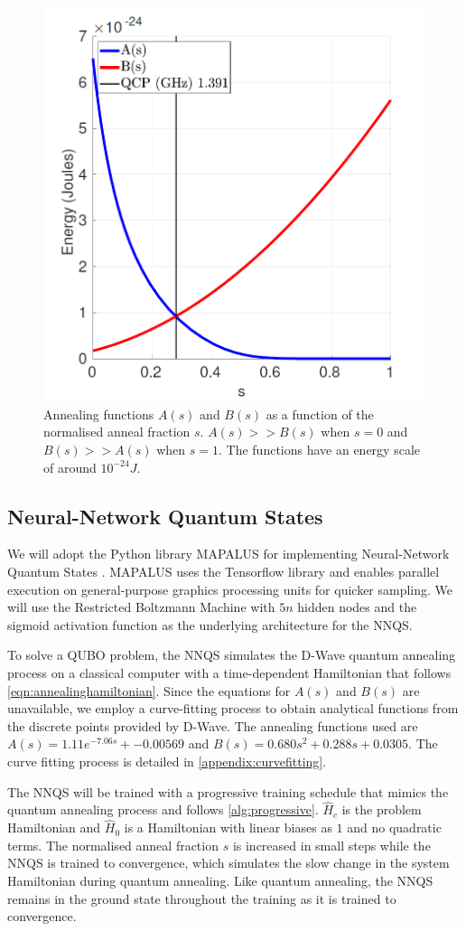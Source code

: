 \begin{figure}[htb!]
    \centering
    \includegraphics[width=0.5\linewidth]{images/dwave_annealing.png}
    \caption[Annealing functions $A(s)$ and $B(s)$ as a function of the normalised anneal fraction $s$. $A(s) >> B(s)$ when $s=0$ and $B(s) >> A(s)$ when $s=1$. The functions have an energy scale of around $10^{-24} J$.]{Annealing functions $A(s)$ and $B(s)$ as a function of the normalised anneal fraction $s$. $A(s) >> B(s)$ when $s=0$ and $B(s) >> A(s)$ when $s=1$. The functions have an energy scale of around $10^{-24} J$. ~\protect\cite{dwaveadvantage}}
    \label{dwaveannealing}
\end{figure}

\subsection{Neural-Network Quantum States}
We will adopt the Python library MAPALUS for implementing Neural-Network Quantum States \cite{b25}. MAPALUS uses the Tensorflow library and enables parallel execution on general-purpose graphics processing units for quicker sampling. We will use the Restricted Boltzmann Machine with $5n$ hidden nodes and the sigmoid activation function as the underlying architecture for the NNQS.

To solve a QUBO problem, the NNQS simulates the D-Wave quantum annealing process on a classical computer with a time-dependent Hamiltonian that follows \autoref{eqn:annealinghamiltonian}. Since the equations for $A(s)$ and $B(s)$ are unavailable, we employ a curve-fitting process to obtain analytical functions from the discrete points provided by D-Wave. The annealing functions used are $A(s) = 1.11e^{-7.06s} + -0.00569$ and $B(s)= 0.680s^2 + 0.288s + 0.0305$. The curve fitting process is detailed in \autoref{appendix:curvefitting}.

The NNQS will be trained with a progressive training schedule that mimics the quantum annealing process and follows \autoref{alg:progressive}. $\hat{H}_c$ is the problem Hamiltonian and $\hat{H}_0$ is a Hamiltonian with linear biases as $1$ and no quadratic terms. The normalised anneal fraction $s$ is increased in small steps while the NNQS is trained to convergence, which simulates the slow change in the system Hamiltonian during quantum annealing. Like quantum annealing, the NNQS remains in the ground state throughout the training as it is trained to convergence.

